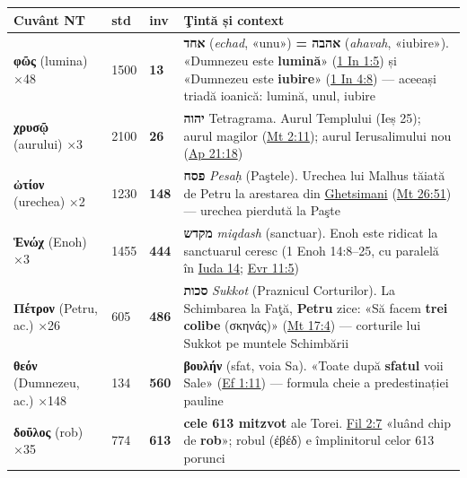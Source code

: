 \documentclass[12pt,a4paper,twoside,openany]{book}
\begin{document}
\begin{center}
\footnotesize
\begin{tabular}{L{2.6cm}C{1cm}C{1.5cm}L{7.6cm}}
\toprule
{}
\textbf{Cuvânt NT} & \textbf{std} & \textbf{inv} & \textbf{Ţintă și context} \\
\midrule
\textbf{φῶς} (lumina) ×48 & 1500 & \textbf{13} & \textbf{אחד} (\textit{echad}, «unu») \textbf{= אהבה} (\textit{ahavah}, «iubire»). «Dumnezeu este \textbf{lumină}» (\href{https://bibliaortodoxa.ro/carte.php?id=69\&cap=1\#5}{1 In 1:5}) și «Dumnezeu este \textbf{iubire}» (\href{https://bibliaortodoxa.ro/carte.php?id=69\&cap=4\#8}{1 In 4:8}) --- aceeași triadă ioanică: lumină, unul, iubire \\
\textbf{χρυσῷ} (aurului) ×3 & 2100 & \textbf{26} & \textbf{יהוה} Tetragrama. Aurul Templului (Ieș 25); aurul magilor (\href{https://bibliaortodoxa.ro/carte.php?id=55\&cap=2\#11}{Mt 2:11}); aurul Ierusalimului nou (\href{https://bibliaortodoxa.ro/carte.php?id=78\&cap=21\#18}{Ap 21:18}) \\
\textbf{ὠτίον} (urechea) ×2 & 1230 & \textbf{148} & \textbf{פסח} \textit{Pesa\d{h}} (Paştele). Urechea lui Malhus tăiată de Petru la arestarea din \href{https://bibliaortodoxa.ro/carte.php?id=35\&cap=18\#10}{Ghetsimani} (\href{https://bibliaortodoxa.ro/carte.php?id=55\&cap=26\#51}{Mt 26:51}) --- urechea pierdută la Paşte \\
\textbf{Ἑνώχ} (Enoh) ×3 & 1455 & \textbf{444} & \textbf{מקדש} \textit{miqdash} (sanctuar). Enoh este ridicat la sanctuarul ceresc (1 Enoh 14:8--25, cu paralelă în \href{https://bibliaortodoxa.ro/carte.php?id=65\&cap=1\#14}{Iuda 14}; \href{https://bibliaortodoxa.ro/carte.php?id=65\&cap=11\#5}{Evr 11:5}) \\
\textbf{Πέτρον} (Petru, ac.) ×26 & 605 & \textbf{486} & \textbf{סכות} \textit{Sukkot} (Praznicul Corturilor). La Schimbarea la Faţă, \textbf{Petru} zice: «Să facem \textbf{trei colibe} (σκηνάς)» (\href{https://bibliaortodoxa.ro/carte.php?id=55\&cap=17\#4}{Mt 17:4}) --- corturile lui Sukkot pe muntele Schimbării \\
\textbf{θεόν} (Dumnezeu, ac.) ×148 & 134 & \textbf{560} & \textbf{βουλήν} (sfat, voia Sa). «Toate după \textbf{sfatul} voii Sale» (\href{https://bibliaortodoxa.ro/carte.php?id=56\&cap=1\#11}{Ef 1:11}) --- formula cheie a predestinației pauline \\
\textbf{δοῦλος} (rob) ×35 & 774 & \textbf{613} & \textbf{cele 613 mitzvot} ale Torei. \href{https://bibliaortodoxa.ro/carte.php?id=57\&cap=2\#7}{Fil 2:7} «luând chip de \textbf{rob}»; robul (ἐβέδ) e împlinitorul celor 613 porunci \\

\end{tabular}
\end{center}
\end{document}
